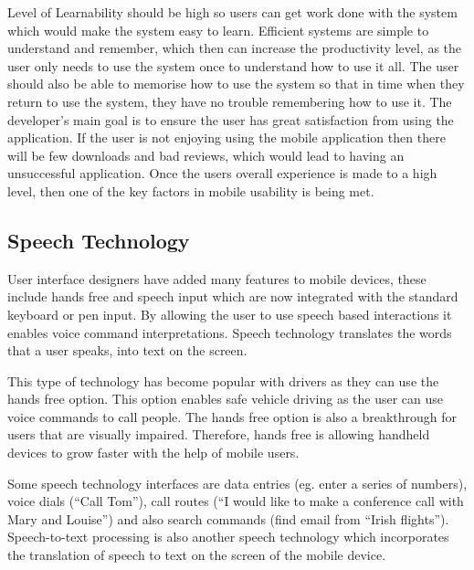 \documentclass[runningheads,a4paper]{llncs}
\begin{document}
\begin{inparaenum}[]
Level of Learnability should be high so users can get work done with the system which would make the system easy to learn. Efficient systems are simple to understand and remember, which then can increase the productivity level, as the user only needs to use the system once to understand how to use it all. The user should also be able to memorise how to use the system so that in time when they return to use the system, they have no trouble remembering how to use it. The developer’s main goal is to ensure the user has great satisfaction from using the application. If the user is not enjoying using the mobile application then there will be few downloads and bad reviews, which would lead to having an unsuccessful application. Once the users overall experience is made to a high level, then one of the key factors in mobile usability is being met.
\end{inparaenum}

\subsection{Speech Technology}
\label{sec:Speech Technology}
\begin{inparaenum}[]
User interface designers have added many features to mobile devices, these include hands free and speech input which are now integrated with the standard keyboard or pen input. By allowing the user to use speech based interactions it enables voice command interpretations. Speech technology translates the words that a user speaks, into text on the screen. 
\end{inparaenum}

\begin{inparaenum}[]
This type of technology has become popular with drivers as they can use the hands free option. This option enables safe vehicle  driving as the user can use voice commands to call people. The hands free option is also a breakthrough for users that are visually impaired. Therefore, hands free is allowing handheld devices to grow faster with the help of mobile users.
\end{inparaenum}

\begin{inparaenum}[]
Some speech technology interfaces are data entries (eg. enter a series of numbers), voice dials (“Call Tom”), call routes (“I would like to make a conference call with Mary and Louise”) and also search commands (find email from “Irish flights”).  Speech-to-text processing is also another speech technology which incorporates the translation of speech to text on the screen of the mobile device. 
\end{inparaenum}
\end{document}
